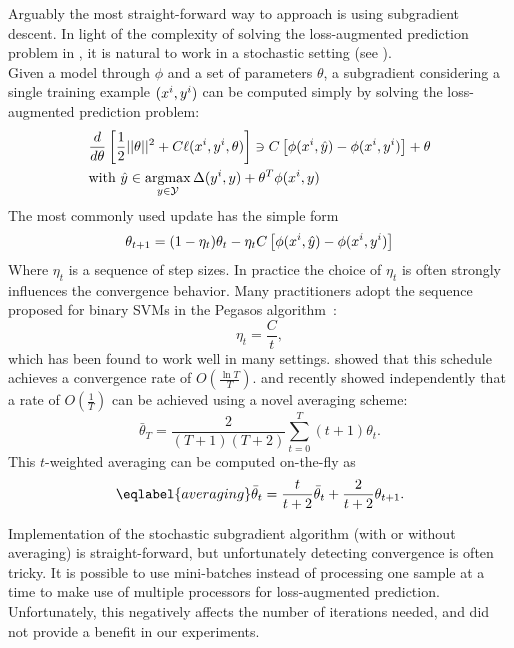 Arguably the most straight-forward way to approach  is
using subgradient descent.  In light of the complexity of solving the
loss-augmented prediction problem in , it is natural
to work in a stochastic setting (see \citet{ratliff2007online}).\pagebreak\\
Given a model through $\phi$ and a set of parameters $\theta$, a subgradient
considering a single training example $(x^{i}, y^{i})$
can be computed simply by solving the loss-augmented prediction problem:
\begin{align}
    &\frac{d}{d\theta} \left [ \frac{1}{2} ||\theta||^2 + C \ell(x^{i}, y^{i}, \theta) \right ] \ni C\left [ \phi(x^{i}, \hat{y}) - \phi(x^{i}, y^{i}) \right]+ \theta\\
    &\text{with }\hat{y} \in \operatorname*{argmax}_{y \in \mathcal{Y}} \Delta(y^{i}, y) + \theta^T \phi(x^{i}, y)
\end{align}
The most commonly used update has the simple form
\begin{equation}
    \theta_{t+1} = (1 - \eta_t) \theta_t - \eta_t C \left [\phi(x^{i}, \hat{y}) - \phi(x^{i}, y^{i})\right]
\end{equation}
Where $\eta_t$ is a sequence of step sizes.
In practice the choice of $\eta_t$ is often strongly influences the convergence behavior.
Many practitioners adopt the sequence proposed for binary SVMs in the Pegasos algorithm~\citep{shalev2011pegasos}:
\begin{equation}
    \eta_t = \frac{C}{t},
\end{equation}
which has been found to work well in many settings.
\citet{shalev2011pegasos} showed that this schedule achieves a convergence rate of $O(\frac{\ln T }{T})$.
\citet{lacoste2012block} and \citet{shamir2012stochastic} recently showed independently that
a rate of $O(\frac{1}{T})$ can be achieved using a novel averaging scheme:
\begin{equation}
    \bar{\theta}_{T} = \frac{2}{(T+1)(T+2)} \sum_{t=0}^T(t+1) \theta_t.
\end{equation}
This $t$-weighted averaging can be computed on-the-fly as
\begin{equation}\eqlabel{averaging}
    \bar{\theta}_{t} = \frac{t}{t + 2} \bar{\theta}_t + \frac{2}{t+2} \theta_{t+1}.
\end{equation}

Implementation of the stochastic subgradient algorithm (with or without
averaging) is straight-forward, but unfortunately detecting convergence is
often tricky.
It is possible to use mini-batches instead of processing one sample at a time
to make use of multiple processors for loss-augmented prediction. Unfortunately,
this negatively affects the number of iterations needed, and did not provide a
benefit in our experiments.

